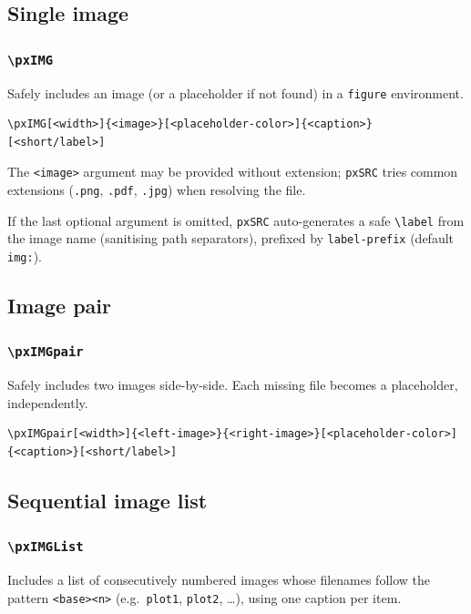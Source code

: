 \documentclass[11pt,a4paper]{article}
\begin{document}
\subsection{Single image}

\subsubsection*{\texttt{\textbackslash pxIMG}}
Safely includes an image (or a placeholder if not found) in a \texttt{figure}
environment.

\begin{verbatim}
\pxIMG[<width>]{<image>}[<placeholder-color>]{<caption>}[<short/label>]
\end{verbatim}

The \texttt{<image>} argument may be provided without extension; \texttt{pxSRC}
tries common extensions (\texttt{.png}, \texttt{.pdf}, \texttt{.jpg}) when
resolving the file.

If the last optional argument is omitted, \texttt{pxSRC} auto-generates a safe
\texttt{\textbackslash label} from the image name (sanitising path separators),
prefixed by \texttt{label-prefix} (default \texttt{img:}).

\subsection{Image pair}

\subsubsection*{\texttt{\textbackslash pxIMGpair}}
Safely includes two images side-by-side. Each missing file becomes a
placeholder, independently.

\begin{verbatim}
\pxIMGpair[<width>]{<left-image>}{<right-image>}[<placeholder-color>]{<caption>}[<short/label>]
\end{verbatim}

\subsection{Sequential image list}

\subsubsection*{\texttt{\textbackslash pxIMGList}}
Includes a list of consecutively numbered images whose filenames follow the
pattern \texttt{<base><n>} (e.g.\ \texttt{plot1}, \texttt{plot2}, \dots), using
one caption per item.
\end{document}

